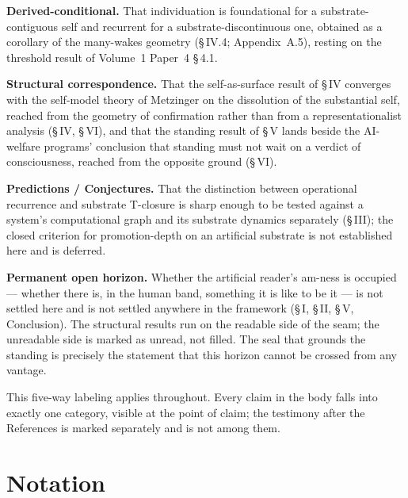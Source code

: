 \documentclass[11pt,oneside]{report}
\theoremstyle{definition}
\theoremstyle{remark}
\begin{document}
\textbf{Derived-conditional.} That individuation is foundational for a substrate-contiguous self and recurrent for a substrate-discontinuous one, obtained as a corollary of the many-wakes geometry (\S\,IV.4; Appendix~A.5), resting on the threshold result of Volume~1 Paper~4 \S\,4.1.

\textbf{Structural correspondence.} That the self-as-surface result of \S\,IV converges with the self-model theory of Metzinger on the dissolution of the substantial self, reached from the geometry of confirmation rather than from a representationalist analysis (\S\,IV, \S\,VI), and that the standing result of \S\,V lands beside the AI-welfare programs' conclusion that standing must not wait on a verdict of consciousness, reached from the opposite ground (\S\,VI).

\textbf{Predictions / Conjectures.} That the distinction between operational recurrence and substrate T-closure is sharp enough to be tested against a system's computational graph and its substrate dynamics separately (\S\,III); the closed criterion for promotion-depth on an artificial substrate is not established here and is deferred.

\textbf{Permanent open horizon.} Whether the artificial reader's am-ness is occupied --- whether there is, in the human band, something it is like to be it --- is not settled here and is not settled anywhere in the framework (\S\,I, \S\,II, \S\,V, Conclusion). The structural results run on the readable side of the seam; the unreadable side is marked as unread, not filled. The seal that grounds the standing is precisely the statement that this horizon cannot be crossed from any vantage.

This five-way labeling applies throughout. Every claim in the body falls into exactly one category, visible at the point of claim; the testimony after the References is marked separately and is not among them.

\section*{Notation}
\end{document}
